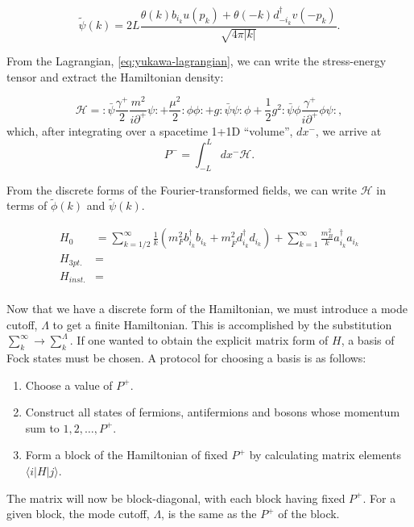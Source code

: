 \begin{equation}
    \tilde \psi(k) = 2L \frac{\theta(k)b_{i_k}u(p_k) + \theta(-k)d^\dagger_{-i_k}v(-p_k)}{\sqrt{4\pi |k|}}.
\end{equation}

From the Lagrangian, \ref{eq:yukawa-lagrangian}, we can write the stress-energy tensor and extract the Hamiltonian density: 

\begin{equation}
    \mathcal{H} = : \bar\psi \frac{\gamma^+}{2}
    \frac{ m^2 }
    {i\partial^+}\psi :
  + \frac{\mu^2}{2} :\phi \phi:
  + g : \bar\psi\psi : \phi
  + \frac{1}{2} g^2
  :\bar\psi \phi
  \frac{\gamma^+}{i\partial^+} \phi \psi:,
\end{equation}
which, after integrating over a spacetime 1+1D ``volume'', $dx^-$, we arrive at $$P^- = \int_{-L}^L dx^- \mathcal{H}.$$

From the discrete forms of the Fourier-transformed fields, we can write $\mathcal{H}$ in terms of $\tilde \phi(k)$ and $\tilde \psi(k)$.

\begin{align}
    H_0 &= \sum_{k = 1/2}^\infty \frac{1}{k}\left(m_F^2 b_{i_k}^\dagger b_{i_k} + m_{\bar F}^2 d_{i_k}^\dagger d_{i_k} \right) + \sum_{k = 1}^\infty \frac{m_B^2}{k}a_{i_k}^\dagger a_{i_k}\\ \nonumber
    H_{3pt.} &= \\\nonumber
    H_{inst.} &= \\\nonumber
\end{align}

Now that we have a discrete form of the Hamiltonian, we must introduce a mode cutoff, $\Lambda$ to get a finite Hamiltonian.
This is accomplished by the substitution $\sum_k^\infty \rightarrow \sum_k^\Lambda$.
If one wanted to obtain the explicit matrix form of $H$, a basis of Fock states must be chosen. 
A protocol for choosing a basis is as follows:

\begin{enumerate}
    \item Choose a value of $P^+$.
    \item Construct all states of fermions, antifermions and bosons whose momentum sum to $1, 2, \dots, P^+$.
    \item Form a block of the Hamiltonian of fixed $P^+$ by calculating matrix elements $\langle i|H|j\rangle$.
\end{enumerate}

The matrix will now be block-diagonal, with each block having fixed $P^+$.
For a given block, the mode cutoff, $\Lambda$, is the same as the $P^+$ of the block.